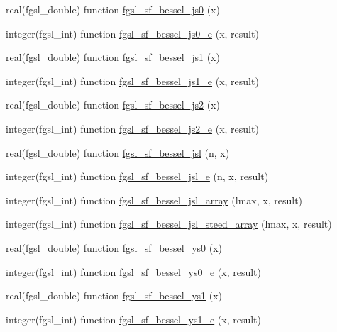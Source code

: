 \begin{DoxyCompactItemize}
\item 
real(fgsl\-\_\-double) function \hyperlink{specfunc_8finc_a2966accc3e88380bcbaee51586c8b43d}{fgsl\-\_\-sf\-\_\-bessel\-\_\-js0} (x)
\item 
integer(fgsl\-\_\-int) function \hyperlink{specfunc_8finc_a1dc8fcfff146f535450ede5e44a90cea}{fgsl\-\_\-sf\-\_\-bessel\-\_\-js0\-\_\-e} (x, result)
\item 
real(fgsl\-\_\-double) function \hyperlink{specfunc_8finc_a02f9f26c36dfe54bc655e3b93894fb90}{fgsl\-\_\-sf\-\_\-bessel\-\_\-js1} (x)
\item 
integer(fgsl\-\_\-int) function \hyperlink{specfunc_8finc_a86aaeb9694ad08a11e19d1acada66004}{fgsl\-\_\-sf\-\_\-bessel\-\_\-js1\-\_\-e} (x, result)
\item 
real(fgsl\-\_\-double) function \hyperlink{specfunc_8finc_a608f4e025e3aa1384a6789234f830848}{fgsl\-\_\-sf\-\_\-bessel\-\_\-js2} (x)
\item 
integer(fgsl\-\_\-int) function \hyperlink{specfunc_8finc_a1f79f88aefc057bb8992f2ed7f47e2b0}{fgsl\-\_\-sf\-\_\-bessel\-\_\-js2\-\_\-e} (x, result)
\item 
real(fgsl\-\_\-double) function \hyperlink{specfunc_8finc_ad3d25735619514a2f11d8f3d82a46a18}{fgsl\-\_\-sf\-\_\-bessel\-\_\-jsl} (n, x)
\item 
integer(fgsl\-\_\-int) function \hyperlink{specfunc_8finc_a115a99b84e0d4433a55530edd599c07e}{fgsl\-\_\-sf\-\_\-bessel\-\_\-jsl\-\_\-e} (n, x, result)
\item 
integer(fgsl\-\_\-int) function \hyperlink{specfunc_8finc_adad29813d45e51c21cee09228d83621e}{fgsl\-\_\-sf\-\_\-bessel\-\_\-jsl\-\_\-array} (lmax, x, result)
\item 
integer(fgsl\-\_\-int) function \hyperlink{specfunc_8finc_a83a1bfba4edb59ec86b0f4151d9e916a}{fgsl\-\_\-sf\-\_\-bessel\-\_\-jsl\-\_\-steed\-\_\-array} (lmax, x, result)
\item 
real(fgsl\-\_\-double) function \hyperlink{specfunc_8finc_a1d0cce4a15fb4e807c6085abee9d6bfc}{fgsl\-\_\-sf\-\_\-bessel\-\_\-ys0} (x)
\item 
integer(fgsl\-\_\-int) function \hyperlink{specfunc_8finc_a481cf0b90daf25842c450603ba108c16}{fgsl\-\_\-sf\-\_\-bessel\-\_\-ys0\-\_\-e} (x, result)
\item 
real(fgsl\-\_\-double) function \hyperlink{specfunc_8finc_a6bd2124b7b0c9c34d4b5a5256b99aa0f}{fgsl\-\_\-sf\-\_\-bessel\-\_\-ys1} (x)
\item 
integer(fgsl\-\_\-int) function \hyperlink{specfunc_8finc_aa60914e596879edadfc6824a44200ca3}{fgsl\-\_\-sf\-\_\-bessel\-\_\-ys1\-\_\-e} (x, result)

\end{DoxyCompactItemize}
